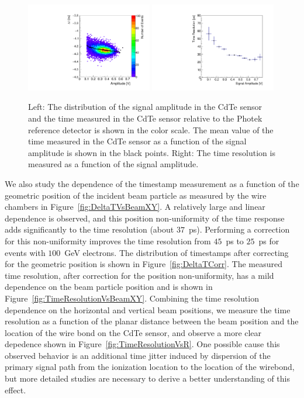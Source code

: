 \begin{figure}[htbp] 
\centering
\includegraphics[width=0.49\textwidth]{figures/100GeV_deltaTVsAmp.pdf} 
\includegraphics[width=0.49\textwidth]{figures/TimeResolutionVsAmplitude.pdf} 
\caption{ Left: The distribution of the signal amplitude in the CdTe sensor and 
the time measured in the CdTe sensor relative to the Photek reference detector
is shown in the color scale. The mean value of the time measured in the CdTe sensor 
as a function of the signal amplitude is shown in the black points. Right: The
time resolution is measured as a function of the signal amplitude. } 
\label{fig:DeltaTVsAmplitude} 
\end{figure} 


We also study the dependence of the timestamp measurement as a function of the geometric
position of the incident beam particle as measured by the wire chambers in 
Figure~\ref{fig:DeltaTVsBeamXY}. A relatively large and linear dependence is observed, 
and this position non-uniformity of the time response adds significantly to the 
time resolution (about $37$~ps). Performing a correction for this non-uniformity improves
the time resolution from $45$~ps to $25$~ps for events with $100$~GeV electrons.
The distribution of timestamps after correcting for the geometric position is shown
in Figure~\ref{fig:DeltaTCorr}. The measured time resolution, after correction for
the position non-uniformity, has a mild dependence on the beam particle position 
and is shown in Figure~\ref{fig:TimeResolutionVsBeamXY}. Combining the time resolution
dependence on the horizontal and vertical beam positions, we measure the time resolution
as a function of the planar distance between the beam position and the location of the 
wire bond on the CdTe sensor, and observe a more clear depedence shown in 
Figure~\ref{fig:TimeResolutionVsR}. One possible cause this observed behavior
is an additional time jitter induced by dispersion of the primary signal path from the
ionization location to the location of the wirebond, but more detailed studies are necessary
to derive a better understanding of this effect.

